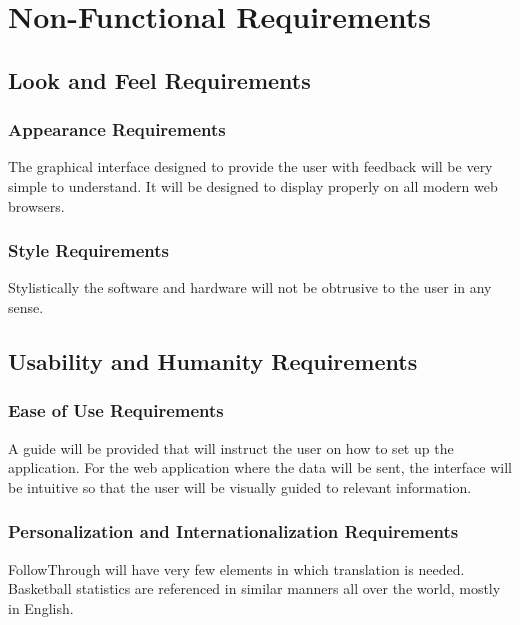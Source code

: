 \chapter{Non-Functional Requirements}

\section{Look and Feel Requirements}
\subsection{Appearance Requirements}
\hspace*{4mm}The graphical interface designed to provide the user with feedback will be very simple to understand. It will be designed to display properly on all modern web browsers. 


\subsection{Style Requirements}
\hspace*{4mm}Stylistically the software and hardware will not be obtrusive to the user in any sense.

\section{Usability and Humanity Requirements}
\subsection{Ease of Use Requirements}
\hspace*{4mm} A guide will be provided that will instruct the user on how to set up the application. For the web application where the data will be sent, the interface will be intuitive so that the user will be visually guided to relevant information.

\subsection{Personalization and Internationalization Requirements}
\hspace*{4mm}FollowThrough will have very few elements in which translation is needed. Basketball statistics are referenced in similar manners all over the world, mostly in English.
 
